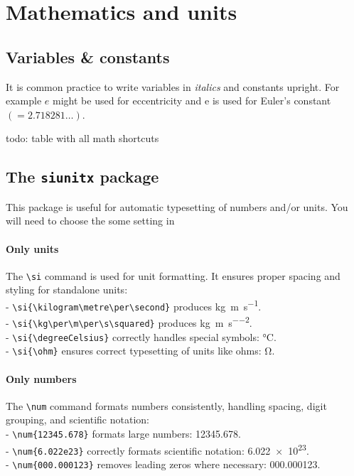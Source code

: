 \section{Mathematics and units}


\subsection{Variables \& constants}
	
	It is common practice to write variables in \textit{italics} and constants upright. For example $e$ might be used for eccentricity and $\mathrm{e} $ is used for Euler's constant $(=\num{2.718281}\dots)$.
	
	todo: table with all math shortcuts


\subsection{The \texttt{siunitx} package}

	This package is useful for automatic typesetting of numbers and/or units. You will need to choose the some setting in %
	
	\paragraph*{Only units}
	The \verb|\si| command is used for unit formatting. It ensures proper spacing and styling for standalone units:  \\
	- \verb|\si{\kilogram\metre\per\second}| produces \si{\kilogram\metre\per\second}.  \\
	- \verb|\si{\kg\per\m\per\s\squared}| produces \si{\kg\per\m\per\s\squared}.  \\
	- \verb|\si{\degreeCelsius}| correctly handles special symbols: \si{\degreeCelsius}.  \\
	- \verb|\si{\ohm}| ensures correct typesetting of units like ohms: \si{\ohm}.  
	
	\paragraph*{Only numbers}
	The \verb|\num| command formats numbers consistently, handling spacing, digit grouping, and scientific notation:  \\
	- \verb|\num{12345.678}| formats large numbers: \num{12345.678}. \\ 
	- \verb|\num{6.022e23}| correctly formats scientific notation: \num{6.022e23}.  \\
	- \verb|\num{000.000123}| removes leading zeros where necessary: \num{000.000123}.  
	
